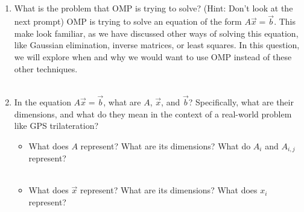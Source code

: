 \\ \\
\\ \\
\begin{enumerate}
    \item What is the problem that OMP is trying to solve? (Hint: Don't look at the next prompt)
    \answerbox{1cm}
    OMP is trying to solve an equation of the form $A\vec{x} = \vec{b}$.
    This make look familiar, as we have discussed other ways of solving this equation,
    like Gaussian elimination, inverse matrices, or least squares.
    In this question, we will explore when and why we would want to use OMP instead of
    these other techniques.
    \\ \\

    \item In the equation $A\vec{x} = \vec{b}$, what are $A$, $\vec{x}$, and $\vec{b}$?
    Specifically, what are their dimensions, and what do they mean in the context of
    a real-world problem like GPS trilateration? 
    \begin{itemize}
        \item What does $A$ represent? What are its dimensions? What do $A_i$ and $A_{i,j}$ represent?
        \answerbox{0.5cm}
        \\ \\

        \item What does $\vec{x}$ represent? What are its dimensions? What does $x_i$ represent?
        \answerbox{0.5cm}
        \\ \\


\end{itemize}
\end{enumerate}
